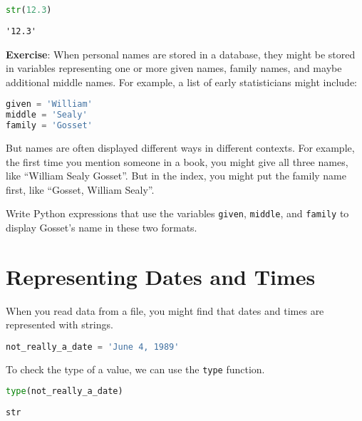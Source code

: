 \begin{lstlisting}[language=Python,style=source]
str(12.3)
\end{lstlisting}

\begin{lstlisting}[style=output]
'12.3'
\end{lstlisting}

\textbf{Exercise}: When personal names are stored in a database, they
might be stored in variables representing one or more given names,
family names, and maybe additional middle names. For example, a list of
early statisticians might include:

\begin{lstlisting}[language=Python,style=source]
given = 'William'
middle = 'Sealy'
family = 'Gosset'
\end{lstlisting}

But names are often displayed different ways in different contexts. For
example, the first time you mention someone in a book, you might give
all three names, like ``William Sealy Gosset''. But in the index, you
might put the family name first, like ``Gosset, William Sealy''.

Write Python expressions that use the variables
\passthrough{\lstinline!given!}, \passthrough{\lstinline!middle!}, and
\passthrough{\lstinline!family!} to display Gosset's name in these two
formats.

\hypertarget{representing-dates-and-times}{%
\section{Representing Dates and
Times}\label{representing-dates-and-times}}

When you read data from a file, you might find that dates and times are
represented with strings.

\begin{lstlisting}[language=Python,style=source]
not_really_a_date = 'June 4, 1989'
\end{lstlisting}

To check the type of a value, we can use the
\passthrough{\lstinline!type!} function.

\begin{lstlisting}[language=Python,style=source]
type(not_really_a_date)
\end{lstlisting}

\begin{lstlisting}[style=output]
str
\end{lstlisting}

